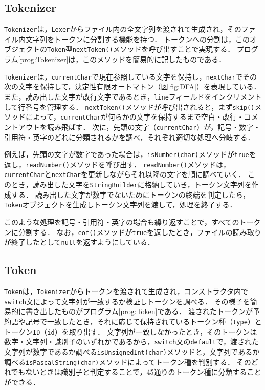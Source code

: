 \documentclass[a4j,10pt]{jarticle}
\begin{document}
\subsection{Tokenizer}
\verb|Tokenizer|は，\verb|Lexer|からファイル内の全文字列を渡されて生成され，そのファイル内文字列をトークンに分割する機能を持つ．
トークンへの分割は，このオブジェクトの\verb|Token|型\verb|nextToken()|メソッドを呼び出すことで実現する．
プログラム\ref{prog:Tokenizer}は，このメソッドを簡易的に記したものである．

\verb|Tokenizer|は，\verb|currentChar|で現在参照している文字を保持し，\verb|nextChar|でその次の文字を保持して，決定性有限オートマトン（図\ref{fig:DFA}）を表現している．
また，読み出した文字が改行文字であるとき，\verb|line|フィールドをインクリメントして行番号を管理する．
\verb|nextToken()|メソッドが呼び出されると，まず\verb|skip()|メソッドによって，\verb|currentChar|が何らかの文字を保持するまで空白・改行・コメントアウトを読み飛ばす．
次に，先頭の文字（\verb|currentChar|）が，記号・数字・引用符・英字のどれに分類されるかを調べ，それぞれ適切な処理へ分岐する．

例えば，先頭の文字が数字であった場合は，\verb|isNumber(char)|メソッドが\verb|true|を返し，\verb|readNumber()|メソッドを呼び出す．
\verb|readNumber()|メソッドは，\verb|currentChar|と\verb|nextChar|を更新しながらそれ以降の文字を順に調べていく．
このとき，読み出した文字を\verb|StringBuilder|に格納していき，トークン文字列を作成する．
読み出した文字が数字でないためにトークンの終端を判定したら，\verb|Token|オブジェクトを生成しトークン文字列を渡して，処理を終了する．

このような処理を記号・引用符・英字の場合も繰り返すことで，すべてのトークンに分割する．
なお，\verb|eof()|メソッドが\verb|true|を返したとき，ファイルの読み取りが終了したとして\verb|null|を返すようにしている．





\subsection{Token}
\verb|Token|は，\verb|Tokenizer|からトークンを渡されて生成され，コンストラクタ内で\verb|switch|文によって文字列が一致するか検証しトークンを調べる．
その様子を簡易的に書き出したものがプログラム\ref{prog:Token}である．
渡されたトークンが予約語や記号で一致したとき，それに応じて保持されているトークン種（\verb|type|）とトークン\verb|ID|（\verb|id|）を取り出す．
文字列が一致しなかったとき，そのトークンは数字・文字列・識別子のいずれかであるから，\verb|switch|文の\verb|default|で，渡された文字列が数字であるか調べる\verb|isUnsignedInt(char)|メソッドと，文字列であるか調べる\verb|isPascalString(char)|メソッドによってトークン種を判別する．
そのどれでもないときは識別子と判定することで，45通りのトークン種に分類することができる．
\end{document}
